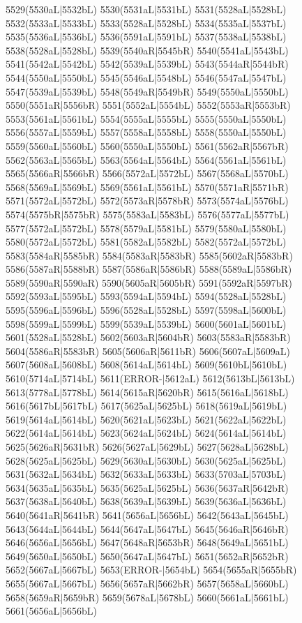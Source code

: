 5529(5530aL|5532bL) 5530(5531aL|5531bL) 5531(5528aL|5528bL) 5532(5533aL|5533bL) 5533(5528aL|5528bL) 5534(5535aL|5537bL) \\5535(5536aL|5536bL) 5536(5591aL|5591bL) 5537(5538aL|5538bL) 5538(5528aL|5528bL) 5539(5540aR|5545bR) 5540(5541aL|5543bL) 5541(5542aL|5542bL) 5542(5539aL|5539bL) 5543(5544aR|5544bR) \\5544(5550aL|5550bL) 5545(5546aL|5548bL) 5546(5547aL|5547bL) 5547(5539aL|5539bL) 5548(5549aR|5549bR) 5549(5550aL|5550bL) 5550(5551aR|5556bR) 5551(5552aL|5554bL) 5552(5553aR|5553bR) \\5553(5561aL|5561bL) 5554(5555aL|5555bL) 5555(5550aL|5550bL) 5556(5557aL|5559bL) 5557(5558aL|5558bL) 5558(5550aL|5550bL) 5559(5560aL|5560bL) 5560(5550aL|5550bL) 5561(5562aR|5567bR) \\5562(5563aL|5565bL) 5563(5564aL|5564bL) 5564(5561aL|5561bL) 5565(5566aR|5566bR) 5566(5572aL|5572bL) 5567(5568aL|5570bL) 5568(5569aL|5569bL) 5569(5561aL|5561bL) 5570(5571aR|5571bR) \\5571(5572aL|5572bL) 5572(5573aR|5578bR) 5573(5574aL|5576bL) 5574(5575bR|5575bR) 5575(5583aL|5583bL) 5576(5577aL|5577bL) 5577(5572aL|5572bL) 5578(5579aL|5581bL) 5579(5580aL|5580bL) \\5580(5572aL|5572bL) 5581(5582aL|5582bL) 5582(5572aL|5572bL) 5583(5584aR|5585bR) 5584(5583aR|5583bR) 5585(5602aR|5583bR) 5586(5587aR|5588bR) 5587(5586aR|5586bR) 5588(5589aL|5586bR) \\5589(5590aR|5590aR) 5590(5605aR|5605bR) 5591(5592aR|5597bR) 5592(5593aL|5595bL) 5593(5594aL|5594bL) 5594(5528aL|5528bL) 5595(5596aL|5596bL) 5596(5528aL|5528bL) 5597(5598aL|5600bL) \\5598(5599aL|5599bL) 5599(5539aL|5539bL) 5600(5601aL|5601bL) 5601(5528aL|5528bL) 5602(5603aR|5604bR) 5603(5583aR|5583bR) 5604(5586aR|5583bR) 5605(5606aR|5611bR) 5606(5607aL|5609aL) \\5607(5608aL|5608bL) 5608(5614aL|5614bL) 5609(5610bL|5610bL) 5610(5714aL|5714bL) 5611(ERROR-|5612aL) 5612(5613bL|5613bL) 5613(5778aL|5778bL) 5614(5615aR|5620bR) 5615(5616aL|5618bL) \\5616(5617bL|5617bL) 5617(5625aL|5625bL) 5618(5619aL|5619bL) 5619(5614aL|5614bL) 5620(5621aL|5623bL) 5621(5622aL|5622bL) 5622(5614aL|5614bL) 5623(5624aL|5624bL) 5624(5614aL|5614bL) \\5625(5626aR|5631bR) 5626(5627aL|5629bL) 5627(5628aL|5628bL) 5628(5625aL|5625bL) 5629(5630aL|5630bL) 5630(5625aL|5625bL) 5631(5632aL|5634bL) 5632(5633aL|5633bL) 5633(5703aL|5703bL) \\5634(5635aL|5635bL) 5635(5625aL|5625bL) 5636(5637aR|5642bR) 5637(5638aL|5640bL) 5638(5639aL|5639bL) 5639(5636aL|5636bL) 5640(5641aR|5641bR) 5641(5656aL|5656bL) 5642(5643aL|5645bL) \\5643(5644aL|5644bL) 5644(5647aL|5647bL) 5645(5646aR|5646bR) 5646(5656aL|5656bL) 5647(5648aR|5653bR) 5648(5649aL|5651bL) 5649(5650aL|5650bL) 5650(5647aL|5647bL) 5651(5652aR|5652bR) \\5652(5667aL|5667bL) 5653(ERROR-|5654bL) 5654(5655aR|5655bR) 5655(5667aL|5667bL) 5656(5657aR|5662bR) 5657(5658aL|5660bL) 5658(5659aR|5659bR) 5659(5678aL|5678bL) 5660(5661aL|5661bL) \\5661(5656aL|5656bL) 